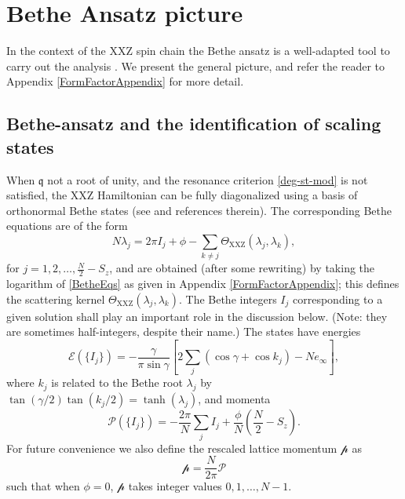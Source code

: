 \documentclass[a4paper,10pt]{article}
\newcommand{\q}{\mathfrak{q}}
\newcommand{\hubert}[1]{$\framebox{\tiny h}$\ \textbf{\texttt{{\color{blue}\footnotesize#1}}}}
\newcommand{\linnea}[1]{$\framebox{\tiny L}$\ \textbf{\texttt{{\color{red}\footnotesize#1}}}}
\newcommand{\jesper}[1]{$\framebox{\tiny J}$\ \textbf{\texttt{{\color{cyan}\footnotesize#1}}}}
\newcommand{\Platt}{\mathcal{P}}
\newcommand{\Pscaled}{{\mathcal p}}
\begin{document}
\section{Bethe Ansatz picture}\label{sec:Bethe}


In the context of the XXZ spin chain the Bethe ansatz is a  well-adapted tool to carry out the analysis \cite{Alcaraz}.
We present the general picture, and refer the reader to Appendix \ref{FormFactorAppendix} for more detail.

\subsection{Bethe-ansatz and the identification of scaling states}\label{Bethe_scaling}

When  $\q$ not a root of unity, and the resonance criterion \eqref{deg-st-mod} is not satisfied, the XXZ Hamiltonian can be fully diagonalized using a basis of orthonormal Bethe states (see \cite{QQ,QQ1} and references therein). The corresponding Bethe equations are of the form
\begin{equation}\label{bethe_eqs_log}
N\lambda_j=2\pi I_j + \phi - \sum_{k\neq j} \Theta_{\text{XXZ}}(\lambda_j,\lambda_k),
\end{equation}
for $j=1,2,\ldots,\frac{N}{2}-S_z$, and are obtained (after some rewriting) by taking the logarithm of \eqref{BetheEqs} as given in Appendix \ref{FormFactorAppendix}; this defines the scattering kernel $\Theta_{\text{XXZ}}(\lambda_j,\lambda_k)$. %
The Bethe integers $I_j$ corresponding to a given solution shall play an important role in the discussion below. (Note: they are sometimes half-integers, despite their name.) The states have energies
%
\begin{equation}\label{bethe_energy}
\mathcal{E}(\{I_j\})=-\frac{\gamma}{\pi\sin\gamma}
 \left[2\sum_j ( \cos \gamma + \cos k_j  )   -N e_\infty \right],
\end{equation}
where $k_j$ is related to the Bethe root $\lambda_j$ by $\tan( \gamma/2 )\tan(k_j/2) = \tanh(\lambda_j)$,
%
and momenta %
\begin{equation}\label{bethe_momentum}
\Platt(\{I_j\})=-\frac{2\pi}{N}\sum_{j}I_j + \frac{\phi}{N}\left(\frac{N}{2}-S_z\right).
\end{equation}
%
%
For future convenience we also define the rescaled lattice momentum $\Pscaled$ as
\begin{equation}\label{rescaled_momentum}
\Pscaled = \frac{N}{2\pi}\Platt
\end{equation}
such that when $\phi=0$, $\Pscaled$ takes integer values $0,1,\hdots,N-1$. %
\end{document}
